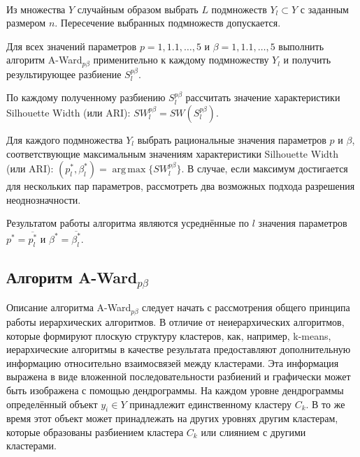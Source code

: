 \documentclass[12pt]{a&t}
\begin{document}
\begin{algorithm} \label{alg:experiment}
	\
	\begin{enumlist}[.] 
		\item
		Из множества $ Y $ случайным образом выбрать $ L $ подмножеств $ Y_l \subset Y $ с заданным размером $ n $. Пересечение выбранных подмножеств допускается.
		
		\item
		Для всех значений параметров $ p=1,1.1,\ldots,5 $ и $ \beta=1,1.1,\ldots,5 $ выполнить алгоритм \mbox{A-Ward$ _{p\beta} $} применительно к каждому подмножеству  $ Y_l $ и получить результирующее разбиение $ S_l^{p\beta} $.
		
		\item
		По каждому полученному разбиению  $ S_l^{p\beta} $ рассчитать значение характеристики Silhouette Width (или ARI): $ SW_l^{p\beta} = SW(S_l^{p\beta}) $.
		
		\item
		Для каждого подмножества $ Y_l $ выбрать рациональные значения параметров $ p $ и $ \beta $, соответствующие максимальным значениям характеристики Silhouette Width (или ARI): $ (p^*_l,\beta^*_l)=\operatorname{arg\,max}\{SW_l^{p\beta}\} $. В случае, если максимум достигается для нескольких пар параметров, рассмотреть два возможных подхода разрешения неоднозначности. 
		
		\item Результатом работы алгоритма являются усреднённые по $ l $ значения параметров $ p^* = \overline{p^*_l} $ и $ \beta^* = \overline{\beta^*_l} $. 
		
	\end{enumlist}
\end{algorithm}

\subsection{Алгоритм \mbox{A-Ward$ _{p\beta} $}} \label{sec:a-ward-p-beta}

Описание алгоритма \mbox{A-Ward$ _{p\beta} $} следует начать с рассмотрения общего принципа работы иерархических алгоритмов. В отличие от неиерархических алгоритмов, которые формируют плоскую структуру кластеров, как, например, \mbox{k-means}, иерархические алгоритмы в качестве результата предоставляют дополнительную информацию относительно взаимосвязей между кластерами. Эта информация выражена в виде вложенной последовательности разбиений \cite{Amorim-Makarenkov-Mirkin} и графически может быть изображена с помощью дендрограммы. На каждом уровне дендрограммы определённый объект $ y_i \in Y$ принадлежит единственному кластеру $ C_k $. В то же время этот объект может принадлежать на других уровнях другим кластерам, которые образованы разбиением кластера $ C_k $ или слиянием с другими кластерами. 
\end{document}
